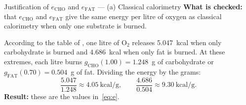 \documentclass[10pt,a4paper]{article}
\newcommand{\sub}[1]{{\scriptscriptstyle\mathrm{#1}}}   %
\newcommand{\CHO}{\sub{CHO}}
\newcommand{\FAT}{\sub{FAT}}
\newcommand{\kcal}{\ensuremath{\mathrm{kcal}}}
\begin{document}
\begin{requadre}{Justification of $e_{\CHO}$ and $e_{\FAT}$ --- (a) Classical calorimetry}
\textbf{What is checked:} that $e_{\CHO}$ and $e_{\FAT}$ give the same energy per litre of
oxygen as classical calorimetry when only one substrate is burned.

\smallskip
According to the table of \citet{peronnet1991}, one litre of O$_2$ releases 5.047~kcal when
only carbohydrate is burned and 4.686~kcal when only fat is burned. At these extremes, each
litre burns $g_{\CHO}(1.00)=1.248$~g of carbohydrate or $g_{\FAT}(0.70)=0.504$~g of fat.
Dividing the energy by the grams:
\[
  \frac{5.047}{1.248}\approx4.05~\kcal/\mathrm{g},\qquad
  \frac{4.686}{0.504}\approx9.30~\kcal/\mathrm{g}.
\]
\textbf{Result:} these are the values in~\eqref{eq:e}.
\end{requadre}
\end{document}
